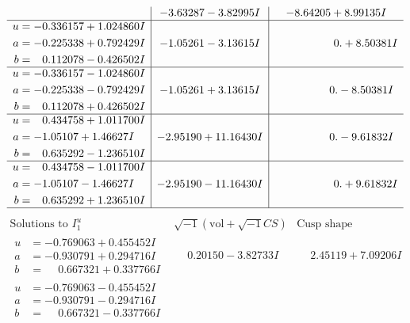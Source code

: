 \documentclass[1p]{elsarticle_modified}
\theoremstyle{definition}
\newcommand{\I}{\sqrt{-1}}
\begin{document}
$$\begin{array}{c|c|c}
 & -3.63287 - 3.82995 I & -8.64205 + 8.99135 I \\ \hline\begin{aligned}
u &= -0.336157 + 1.024860 I \\
a &= -0.225338 + 0.792429 I \\
b &= \phantom{-}0.112078 - 0.426502 I\end{aligned}
 & -1.05261 - 3.13615 I & \phantom{-0.000000 -}0. + 8.50381 I \\ \hline\begin{aligned}
u &= -0.336157 - 1.024860 I \\
a &= -0.225338 - 0.792429 I \\
b &= \phantom{-}0.112078 + 0.426502 I\end{aligned}
 & -1.05261 + 3.13615 I & \phantom{-0.000000 } 0. - 8.50381 I \\ \hline\begin{aligned}
u &= \phantom{-}0.434758 + 1.011700 I \\
a &= -1.05107 + 1.46627 I \\
b &= \phantom{-}0.635292 - 1.236510 I\end{aligned}
 & -2.95190 + 11.16430 I & \phantom{-0.000000 } 0. - 9.61832 I \\ \hline\begin{aligned}
u &= \phantom{-}0.434758 - 1.011700 I \\
a &= -1.05107 - 1.46627 I \\
b &= \phantom{-}0.635292 + 1.236510 I\end{aligned}
 & -2.95190 - 11.16430 I & \phantom{-0.000000 -}0. + 9.61832 I\\
 \hline 
 \end{array}$$\newpage$$\begin{array}{c|c|c}  
\text{Solutions to }I^u_{1}& \I (\text{vol} + \sqrt{-1}CS) & \text{Cusp shape}\\
 \hline 
\begin{aligned}
u &= -0.769063 + 0.455452 I \\
a &= -0.930791 + 0.294716 I \\
b &= \phantom{-}0.667321 + 0.337766 I\end{aligned}
 & \phantom{-}0.20150 - 3.82733 I & \phantom{-}2.45119 + 7.09206 I \\ \hline\begin{aligned}
u &= -0.769063 - 0.455452 I \\
a &= -0.930791 - 0.294716 I \\
b &= \phantom{-}0.667321 - 0.337766 I\end{aligned}

\end{array}$$
\end{document}
